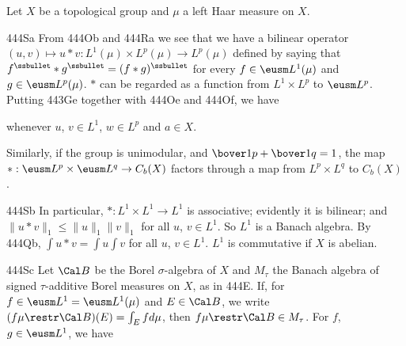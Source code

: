  Let $X$ be a topological group and $\mu$ a left Haar
measure on $X$.

\spheader 444Sa From 444Ob and 444Ra we see that we have a
bilinear operator $(u,v)\mapsto u*v:L^1(\mu)\times L^p(\mu)\to L^p(\mu)$
defined by saying that $f^{\ssbullet}*g^{\ssbullet}=(f*g)^{\ssbullet}$ for
every $f\in\eusm L^1(\mu)$ and $g\in\eusm L^p(\mu)$.
 $*$ can be
regarded as a function from $L^1\times L^p$ to $\eusm L^p$.
Putting 443Ge together with 444Oe and 444Of, we have




\noindent whenever $u$, $v\in L^1$, $w\in L^p$ and $a\in X$.

Similarly, if the group is unimodular, and $\bover1p+\bover1q=1$, the
map $*:\eusm L^p\times\eusm L^q\to C_b(X)$
factors through a map from $L^p\times L^q$ to $C_b(X)$.

\spheader 444Sb In particular, $*:L^1\times L^1\to L^1$ is
associative;  evidently it is bilinear;  and $\|u*v\|_1\le\|u\|_1\|v\|_1$
for all $u$, $v\in L^1$.   So $L^1$ is a Banach
algebra.   By 444Qb, $\int u*v=\int u\int v$ for all $u$, $v\in L^1$.
$L^1$ is commutative if $X$ is abelian.

\spheader 444Sc
Let $\Cal B$ be the Borel $\sigma$-algebra of $X$ and
$M_{\tau}$ the Banach algebra of signed $\tau$-additive Borel
measures on $X$, as in 444E.   If, for $f\in\eusm L^1=\eusm L^1(\mu)$
and $E\in\Cal B$, we
write $(f\mu\restr\Cal B)(E)=\int_Efd\mu$, then
$f\mu\restr\Cal B\in M_{\tau}$.
For $f$, $g\in\eusm L^1$, we have


